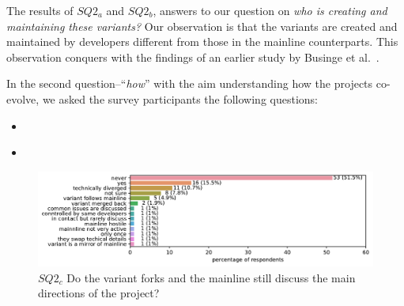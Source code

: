 The results of $SQ2_{a}$ and $SQ2_{b}$, answers to our question on \textit{who is creating and maintaining these variants?} Our observation is that the variants are created and maintained by developers different from those in the mainline counterparts. This observation conquers with the findings of an earlier study by Businge et al.~\cite{businge:emse:2021}.


In the second question--``\textit{how}'' with the aim understanding how the projects co-evolve, we asked the survey participants the following questions:
\begin{itemize}
\item \textbf{\rqTwoThree}
\item   \textbf{\rqTwoFour}
\end{itemize}


\begin{figure}[ht]
\begin{center}
    \centering
    \includegraphics[width=\columnwidth]{pdfs/discussions_rq3_colored.pdf}
    \caption{$SQ2_{c}$ Do the variant forks and the mainline still discuss the main directions of the project?}
    \label{fig:discussions}
\end{center}
\vspace{-.3cm}
\end{figure}


